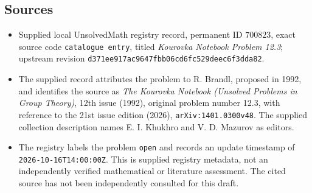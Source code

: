 \documentclass[11pt]{article}
\begin{document}
\subsection{Sources}
\begin{itemize}
\item Supplied local UnsolvedMath registry record, permanent ID \(700823\), exact source code \texttt{catalogue entry}, titled \emph{Kourovka Notebook Problem 12.3}; upstream revision \texttt{d371ee917ac9647fbb06cd6fc529deec6f3dda82}.
\item The supplied record attributes the problem to R. Brandl, proposed in 1992, and identifies the source as \emph{The Kourovka Notebook (Unsolved Problems in Group Theory)}, 12th issue (1992), original problem number 12.3, with reference to the 21st issue edition (2026), \texttt{arXiv:1401.0300v48}. The supplied collection description names E. I. Khukhro and V. D. Mazurov as editors.
\item The registry labels the problem \texttt{open} and records an update timestamp of \texttt{2026-10-16T14:00:00Z}. This is supplied registry metadata, not an independently verified mathematical or literature assessment. The cited source has not been independently consulted for this draft.
\end{itemize}
\end{document}
